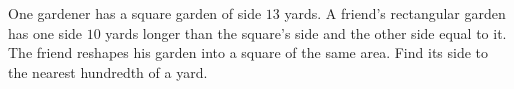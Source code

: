 One gardener has a square garden of side $13$ yards. A friend's rectangular garden has one side $10$ yards longer than the square's side and the other side equal to it. The friend reshapes his garden into a square of the same area. Find its side to the nearest hundredth of a yard.
